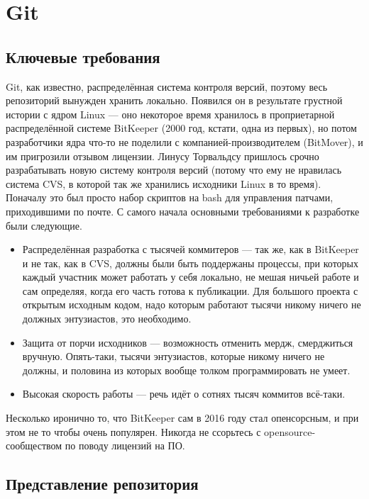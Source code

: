 \documentclass[a5paper]{article}
\begin{document}
\section{Git}

\subsection{Ключевые требования}

Git, как известно, распределённая система контроля версий, поэтому весь репозиторий вынужден хранить локально. Появился он в результате грустной истории с ядром Linux --- оно некоторое время хранилось в проприетарной распределённой системе BitKeeper (2000 год, кстати, одна из первых), но потом разработчики ядра что-то не поделили с компанией-производителем (BitMover), и им пригрозили отзывом лицензии. Линусу Торвальдсу пришлось срочно разрабатывать новую систему контроля версий (потому что ему не нравилась система CVS, в которой так же хранились исходники Linux в то время). Поначалу это был просто набор скриптов на bash для управления патчами, приходившими по почте. С самого начала основными требованиями к разработке были следующие.

\begin{itemize}
    \item Распределённая разработка с тысячей коммитеров --- так же, как в BitKeeper и не так, как в CVS, должны были быть поддержаны процессы, при которых каждый участник может работать у себя локально, не мешая ничьей работе и сам определяя, когда его часть готова к публикации. Для большого проекта с открытым исходным кодом, надо которым работают тысячи никому ничего не должных энтузиастов, это необходимо.
    \item Защита от порчи исходников --- возможность отменить мердж, смерджиться вручную. Опять-таки, тысячи энтузиастов, которые никому ничего не должны, и половина из которых вообще толком программировать не умеет.
    \item Высокая скорость работы --- речь идёт о сотнях тысяч коммитов всё-таки.
\end{itemize}

Несколько иронично то, что BitKeeper сам в 2016 году стал опенсорсным, и при этом не то чтобы очень популярен. Никогда не ссорьтесь с opensource-сообществом по поводу лицензий на ПО.

\subsection{Представление репозитория}
\end{document}
